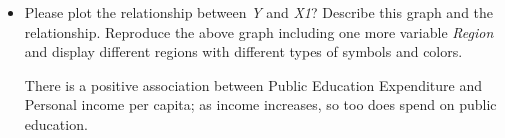 \documentclass[12pt,letterpaper]{article}
\begin{document}
\begin{itemize}
\item
Please plot the relationship between \emph{Y} and \emph{X1}? Describe this graph and the relationship. Reproduce the above graph including one more variable \emph{Region} and display different regions with different types of symbols and colors.

%
\noindent There is a positive association between Public Education Expenditure and Personal income per capita; as income increases, so too does spend on public education.

%

\end{itemize}
\end{document}
